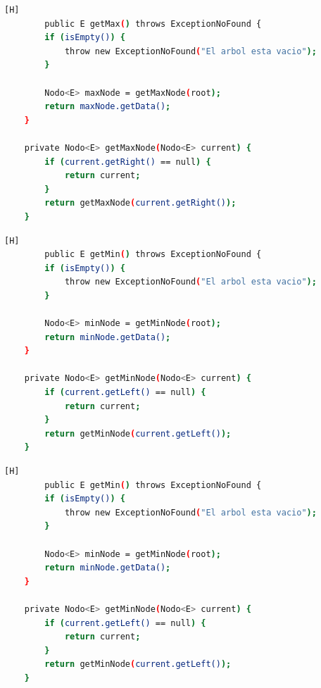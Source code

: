 \documentclass{article}
\begin{document}
	\begin{lstlisting}[language=bash,caption={Clase AVL: Método getMax()}][H]
		public E getMax() throws ExceptionNoFound {
        if (isEmpty()) {
            throw new ExceptionNoFound("El arbol esta vacio");
        }

        Nodo<E> maxNode = getMaxNode(root);
        return maxNode.getData();
    }

    private Nodo<E> getMaxNode(Nodo<E> current) {
        if (current.getRight() == null) {
            return current;
        }
        return getMaxNode(current.getRight());
    }
	\end{lstlisting}
	
	\begin{lstlisting}[language=bash,caption={Clase AVL: Método getMin()}][H]
		public E getMin() throws ExceptionNoFound {
        if (isEmpty()) {
            throw new ExceptionNoFound("El arbol esta vacio");
        }

        Nodo<E> minNode = getMinNode(root);
        return minNode.getData();
    }

    private Nodo<E> getMinNode(Nodo<E> current) {
        if (current.getLeft() == null) {
            return current;
        }
        return getMinNode(current.getLeft());
    }
	\end{lstlisting}
	\begin{lstlisting}[language=bash,caption={Clase AVL: Método getMin()}][H]
		public E getMin() throws ExceptionNoFound {
        if (isEmpty()) {
            throw new ExceptionNoFound("El arbol esta vacio");
        }

        Nodo<E> minNode = getMinNode(root);
        return minNode.getData();
    }

    private Nodo<E> getMinNode(Nodo<E> current) {
        if (current.getLeft() == null) {
            return current;
        }
        return getMinNode(current.getLeft());
    }
	\end{lstlisting}
	
\end{document}
